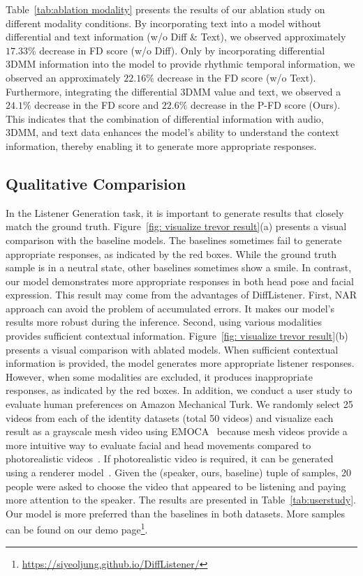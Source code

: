 Table~\ref{tab:ablation modality} presents the results of our ablation study on different modality conditions.
By incorporating text into a model without differential and text information (w/o Diff \& Text),
we observed approximately $17.33\%$ decrease in FD score 
(w/o Diff).
Only by incorporating differential 3DMM information into the model to provide rhythmic temporal information, we observed an approximately $22.16\%$
decrease in the FD score (w/o Text).
Furthermore, integrating the differential 3DMM value and text, we observed a $24.1\%$ decrease in the FD score and $22.6\%$ decrease in the P-FD score (Ours).
This indicates that the combination of differential information with audio, 3DMM, and text data enhances the model's ability to understand the context information, thereby enabling it to generate more appropriate responses.

\subsection{Qualitative Comparision} 
In the Listener Generation task, it is important to generate results that closely match the ground truth.
Figure~\ref{fig: visualize trevor result}(a) presents a visual comparison with the baseline models. The baselines sometimes fail to generate appropriate responses, as indicated by the red boxes. While the ground truth sample is in a neutral state, other baselines sometimes show a smile. In contrast, our model demonstrates more appropriate responses in both head pose and facial expression.
This result may come from the advantages of DiffListener.
First, NAR approach can avoid the problem of accumulated errors. It makes our model's results more robust during the inference.
Second, using various modalities provides sufficient contextual information.
Figure~\ref{fig: visualize trevor result}(b) presents a visual comparison with ablated models. When sufficient contextual information is provided, the model generates more appropriate listener responses. However, when some modalities are excluded, it produces inappropriate responses, as indicated by the red boxes.
In addition, we conduct a user study to evaluate human preferences on Amazon Mechanical Turk. We randomly select 25 videos from each of the identity datasets (total 50 videos) and visualize each result as a grayscale mesh video using EMOCA~\cite{Danecek_2022_CVPR} because mesh videos provide a more intuitive way to evaluate facial and head movements compared to photorealistic videos~\cite{song2023emotional}. If photorealistic video is required, it can be generated using a renderer model~\cite{ren2021pirenderer}.
Given the (speaker, ours, baseline) tuple of samples, 20 people were asked to choose the video that appeared to be listening and paying more attention to the speaker. The results are presented in Table~\ref{tab:userstudy}. Our model is more preferred than the baselines in both datasets. More samples can be found on our demo page\footnote{\url{https://siyeoljung.github.io/DiffListener/}}.